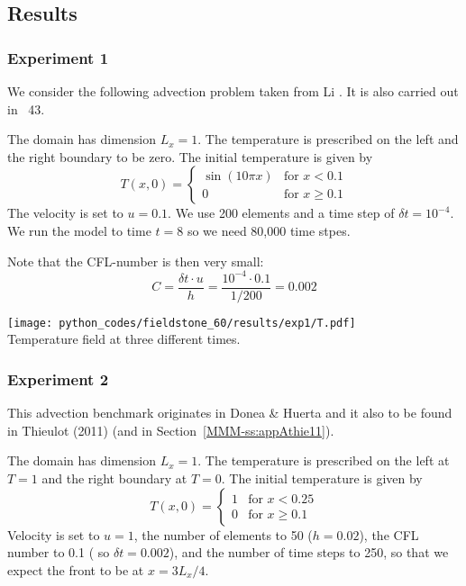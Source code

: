 \subsection*{Results}

\subsubsection*{Experiment 1}

We consider the following advection problem taken from Li \cite[ex 5.2]{li06}.
It is also carried out in \stone~43.

The domain has dimension $L_x=1$. 
The temperature is prescribed on the left and the right boundary to be zero. 
The initial temperature is given by
\[
T(x,0)=
\left\{
\begin{array}{ll}
\sin (10 \pi x) & \textrm{for } x< 0.1 \\
0               & \textrm{for } x\geq 0.1 
\end{array}
\right.
\]
The velocity is set to $u=0.1$.
We use 200 elements and a time step of $\delta t=10^{-4}$. 
We run the model to time $t=8$ so we need 80,000 time stpes. 

Note that the CFL-number is then very small: 
\[
C = \frac{\delta t \cdot u}{h} = \frac{10^{-4} \cdot  0.1}{1/200} = 0.002
\]

\begin{center}
\texttt{[image: python\_codes/fieldstone\_60/results/exp1/T.pdf]}\\
{\captionfont Temperature field at three different times.}
\end{center}


\subsubsection*{Experiment 2}

This advection benchmark originates in Donea \& Huerta \cite{dohu03}
and it also to be found in Thieulot (2011) \cite{thie11} (and in 
Section~\ref{MMM-ss:appAthie11}).

The domain has dimension $L_x=1$. 
The temperature is prescribed on the left at $T=1$
and the right boundary at $T=0$.
The initial temperature is given by
\[
T(x,0)=
\left\{
\begin{array}{ll}
1 & \textrm{for } x< 0.25 \\
0 & \textrm{for } x\geq 0.1 
\end{array}
\right.
\]
Velocity is set to $u=1$, the number of elements to 50 ($h=0.02$), the CFL number to 0.1 (
so $\delta t=0.002$), and the number of time steps to 250, so that we expect the front
to be at $x=3L_x/4$.  

